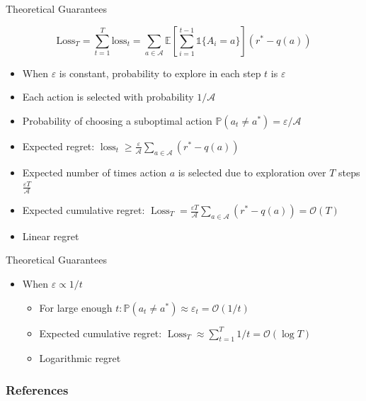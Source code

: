 \documentclass[11pt,table]{beamer}
\begin{document}
\begin{frame}{Theoretical Guarantees}

  \[
  \text{Loss}_T = \sum_{t=1}^{T}\text{loss}_t =   \sum_{a \in \mathcal{A}} \mathbb{E}\left[\sum_{i=1}^{t-1}\mathds{1} \{A_i = a\}\right] (r^* - q(a)) 
  \]


    \begin{itemize}
        \item When $\varepsilon$ is constant, probability to explore in each step $t$ is $\varepsilon$
				\item Each action is selected with probability $1/\mathcal{A}$
				\item Probability of choosing a suboptimal action $\mathbb{P}\left(a_{t} \neq a^{*}\right) = \varepsilon/\mathcal{A}$
				\item Expected regret: $\operatorname{loss}_{t}\geq\frac{\varepsilon}{\mathcal{A}}\sum_{a\in\mathcal{A}}(r^* - q(a))$\\[2ex]\pause
				\item Expected number of times action $a$ is selected due to exploration over $T$ steps $\frac{\varepsilon T}{\mathcal{A}}$
				\item Expected cumulative regret: $\operatorname{Loss}_{T} = \frac{\varepsilon T}{\mathcal{A}}\sum_{a\in\mathcal{A}}(r^* - q(a)) =\mathcal{O}(T)$
\item  \textcolor{red1}{Linear regret}
\end{itemize}
\end{frame}

\begin{frame}{Theoretical Guarantees}
	

    \begin{itemize}
\item When $\varepsilon \propto 1 / t$

\begin{itemize}
\item   For large enough $t: \mathbb{P}\left(a_{t} \neq a^{*}\right) \approx \varepsilon_{t}=\mathcal{O}(1 / t)$
\item   Expected cumulative regret: $\operatorname{Loss}_{T} \approx \sum_{t=1}^{T} 1 / t  =\mathcal{O}(\log T)$
\item   \textcolor{red1}{Logarithmic regret}
    \end{itemize}
    \end{itemize}
\end{frame}


\begin{frame}[t,allowframebreaks
]%
\frametitle{References}
\small

\end{frame}
\end{document}
